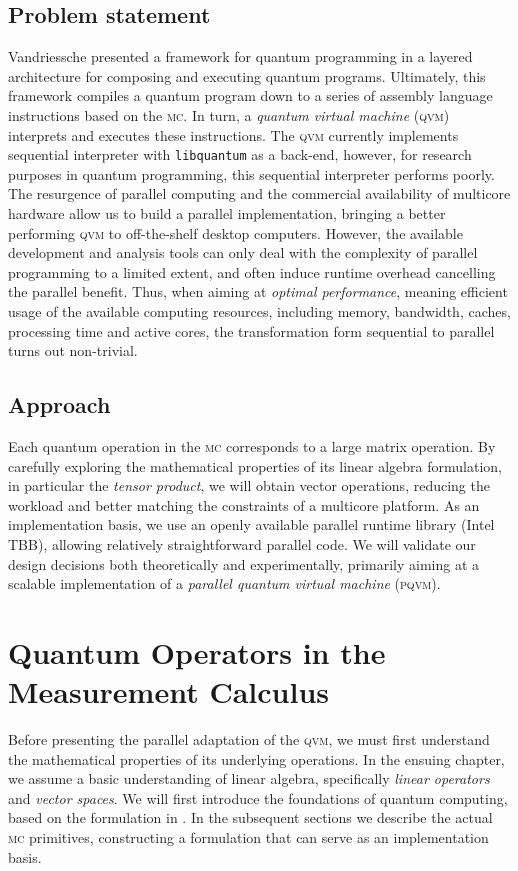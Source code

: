 \documentclass[a4paper,11pt, oneside]{report}
\newcommand{\code}[1]{\texttt{#1}}
\newcommand{\concept}[1]{\emph{#1}}
\newcommand{\acro}[1]{\textsc{#1}}
\begin{document}
\section{Problem statement}
Vandriessche \cite{vandriessche} presented a framework for quantum programming in a layered architecture for composing and executing quantum programs. Ultimately, this framework compiles a quantum program down to a series of assembly language instructions based on the \acro{mc}. In turn, a \concept{quantum virtual machine} (\acro{qvm}) interprets and executes these instructions. The \acro{qvm} currently implements sequential interpreter with \code{libquantum} \cite{libquantum} as a back-end, however, for research purposes in quantum programming, this sequential interpreter performs poorly. The resurgence of parallel computing and the commercial availability of multicore hardware allow us to build a parallel implementation, bringing a better performing \acro{qvm} to off-the-shelf desktop computers.  However, the available development and analysis tools can only deal with the complexity of parallel programming to a limited extent, and often induce runtime overhead cancelling the parallel benefit. Thus, when aiming at \emph{optimal performance}, meaning efficient usage of the available computing resources, including memory, bandwidth, caches, processing time and active cores, the transformation form sequential to parallel turns out non-trivial.

\section{Approach}
Each quantum operation in the \acro{mc} corresponds to a large matrix operation. By carefully exploring the mathematical properties of its linear algebra formulation, in particular the \concept{tensor product}, we will obtain vector operations, reducing the workload and better matching the constraints of a multicore platform. As an implementation basis, we use an openly available parallel runtime library (Intel TBB), allowing relatively straightforward parallel code. We will validate our design decisions both theoretically and experimentally, primarily aiming at a scalable implementation of a \concept{parallel quantum virtual machine} (\acro{pqvm}).


\chapter{Quantum Operators in the Measurement Calculus}\label{chp:qop-mc}
Before presenting the parallel adaptation of the \acro{qvm}, we must first understand the mathematical properties of its underlying operations. In the ensuing chapter, we assume a basic understanding of linear algebra, specifically \concept{linear operators} and \concept{vector spaces}. We will first introduce the foundations of quantum computing, based on the formulation in \cite{kaye-laflamme-mosca}. In the subsequent sections we describe the actual \acro{mc} primitives, constructing a formulation that can serve as an implementation basis.
\end{document}
